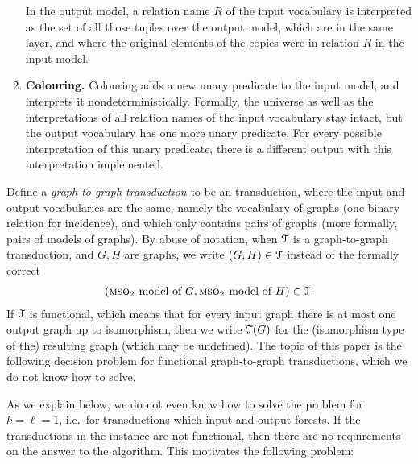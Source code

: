 \begin{definition}
\begin{enumerate}
	In the output model, a relation name $R$ of the input vocabulary is interpreted as the set of all those tuples over the output model, which are in the same layer, and  where the original elements of the copies were in relation $R$
	in the input model.
	\item {\bf Colouring.} \label{mso-trans:colouring} Colouring adds  a new unary predicate to the input model, and interprets it nondeterministically. Formally, the universe as well as the interpretations of all relation names of the input vocabulary stay intact,
	but the output vocabulary has one more unary predicate. For every possible interpretation of this unary predicate, there is a different output with this interpretation implemented.
\end{enumerate}
\end{definition}

  Define a \emph{graph-to-graph \mso transduction} to be an \mso transduction, where the input and output vocabularies are the same, namely the vocabulary of graphs (one binary relation for incidence), and which only contains pairs of graphs (more formally, pairs of \msotwo models of graphs).  By abuse of notation, when ${\mathcal T}$ is a graph-to-graph \mso transduction, and $G,H$ are graphs, we write $(G,H) \in {\mathcal T}$ instead of the formally correct 
\begin{align*}
(\text{{\sc mso$_2$ }model of $G$}, \text{{\sc mso$_2$ }model of $H$})\in {\mathcal T}.
\end{align*}
If ${\mathcal T}$ is functional, which means that for every input graph there is at most one output graph up to isomorphism, then we write ${\mathcal T}(G)$ for the (isomorphism type of the) resulting graph (which may be undefined).
The topic of this paper is   the following  decision problem for functional \mso graph-to-graph transductions, which  we do not know how to solve.



As we explain below, we do not even know how to solve the problem for $k=\ell=1$, i.e.~for \mso transductions which input and output forests.
If the  transductions in the instance are not functional, then there are no requirements on the answer to the algorithm. This motivates the following problem:

